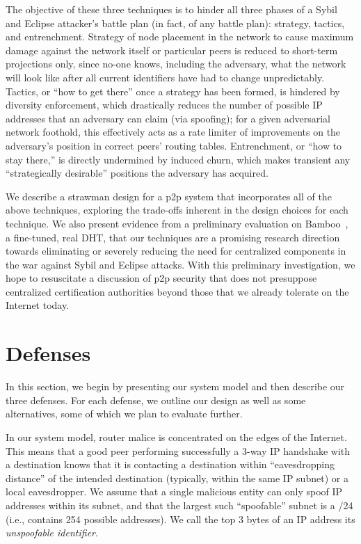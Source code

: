 \documentclass[11pt,twocolumn]{MyTightStyle}
\begin{document}
The objective of these three techniques is to hinder all three phases of
a Sybil and Eclipse attacker's battle plan (in fact, of any battle
plan): strategy, tactics, and entrenchment.  Strategy of node placement
in the network to cause maximum damage against the network itself or
particular peers is reduced to short-term projections only, since no-one
knows, including the adversary, what the network will look like after
all current identifiers have had to change unpredictably.  Tactics, or
``how to get there'' once a strategy has been formed, is hindered by
diversity enforcement, which drastically reduces the number of possible
IP addresses that an adversary can claim (via spoofing); for a given
adversarial network foothold, this effectively acts as a rate limiter of
improvements on the adversary's position in correct peers' routing
tables.  Entrenchment, or ``how to stay there,'' is directly undermined
by induced churn, which makes transient any ``strategically desirable''
positions the adversary has acquired.

We describe a strawman design for a p2p system that incorporates all of
the above techniques, exploring the trade-offs inherent in the design
choices for each technique.  We also present evidence from a preliminary
evaluation on Bamboo~\cite{Rhea2004short}, a
fine-tuned, real DHT, that our techniques are a promising research
direction towards eliminating or severely reducing the need for
centralized components  in the war against Sybil and Eclipse
attacks.
With this preliminary investigation, we hope to
resuscitate a discussion of p2p security that does not presuppose
centralized certification authorities beyond those that we already
tolerate on the Internet today.


\section{Defenses}
\label{sec:defenses}

In this section, we begin by presenting our system model and then
describe our three
defenses. For each defense, we outline our design as well as some
alternatives, some of which we plan to evaluate further. 

In our system model, router malice is concentrated on the edges of the
Internet. This means that a good peer performing successfully a 3-way IP
handshake with a destination knows that it is contacting a destination
within ``eavesdropping distance'' of the intended destination
(typically, within the same IP subnet) or a local eavesdropper.  We
assume that a single malicious entity can only spoof IP addresses within
its subnet, and that the largest such ``spoofable'' subnet is a /24
(i.e., contains 254 possible addresses).  We call the top 3 bytes of an
IP address its \emph{unspoofable identifier}.
\end{document}
